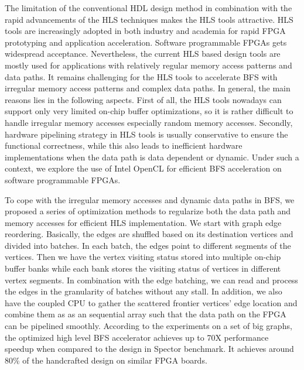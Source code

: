 The limitation of the conventional HDL design method in combination with the 
rapid advancements of the HLS techniques makes the HLS tools attractive. 
HLS tools are increasingly adopted in both industry and academia for rapid FPGA prototyping and 
application acceleration. Software programmable FPGAs \cite{koch2016fpgas, xilinx-sdaccel} 
gets widespread acceptance. Nevertheless, the current HLS based design tools are mostly used for 
applications with relatively regular memory access patterns and data paths. 
It remains challenging for the HLS tools to accelerate BFS with irregular 
memory access patterns and complex data paths. In general, the main reasons lies in the 
following aspects. First of all, the HLS tools nowadays can support only very limited 
on-chip buffer optimizations, so it is rather difficult to handle irregular memory accesses 
especially random memory accesses. Secondly, hardware pipelining strategy in HLS tools 
is usually conservative to ensure the functional correctness, while 
this also leads to inefficient hardware implementations when the data path is data 
dependent or dynamic. Under such a context, we explore the use of Intel OpenCL for 
efficient BFS acceleration on software programmable FPGAs.

To cope with the irregular memory accesses and dynamic data paths in BFS, we proposed 
a series of optimization methods to regularize 
both the data path and memory accesses for efficient HLS implementation. 
We start with graph edge reordering. Basically, the edges 
are shuffled based on its destination vertices and divided into batches. In each batch, 
the edges point to different segments of the vertices. Then we have the vertex visiting 
status stored into multiple on-chip buffer banks while each bank stores the visiting status 
of vertices in different vertex segments. In combination with the edge batching, we can read 
and process the edges in the granularity of batches without any stall. In addition, we also have 
the coupled CPU to gather the scattered frontier vertices' edge location and combine them as 
as an sequential array such that the data path on the FPGA can be pipelined smoothly. 
According to the experiments on a set of big graphs, the optimized high level BFS 
accelerator achieves up to 70X performance speedup when compared to the design 
in Spector benchmark. It achieves around 80\% of the handcrafted design on 
similar FPGA boards. 

